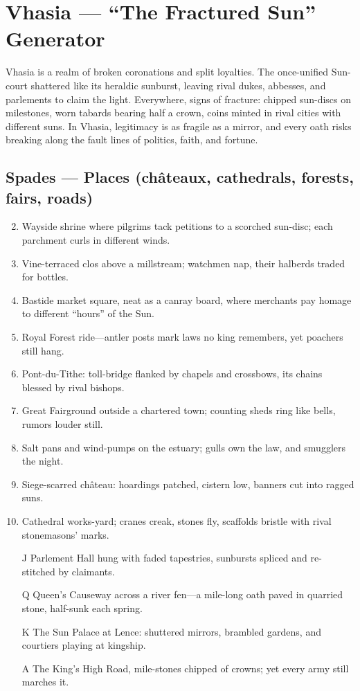 \section{Vhasia --- ``The Fractured Sun'' Generator}
\label{chap:vhasia}

Vhasia is a realm of broken coronations and split loyalties. The once-unified  Sun-court shattered like its heraldic sunburst, leaving rival dukes, abbesses, and parlements to claim the light. Everywhere, signs of fracture: chipped sun-discs on milestones, worn tabards bearing half a crown, coins minted in rival cities with different suns. In Vhasia,  legitimacy is as fragile as a mirror, and every oath risks breaking along the fault lines of politics, faith, and fortune.

\subsection*{Spades --- Places (châteaux, cathedrals, forests, fairs, roads)}
\label{sec:vhasia-places}
\begin{enumerate}
\setcounter{enumi}{1}
\item Wayside shrine where pilgrims tack petitions to a scorched sun-disc; each parchment curls in different winds.
\item Vine-terraced clos above a millstream; watchmen nap, their halberds traded for bottles.
\item Bastide market square, neat as a canray board, where merchants pay homage to different “hours” of the Sun.
\item Royal Forest ride---antler posts mark laws no king remembers, yet poachers still hang.
\item Pont-du-Tithe: toll-bridge flanked by chapels and crossbows, its chains blessed by rival bishops.
\item Great Fairground outside a chartered town; counting sheds ring like bells, rumors louder still.
\item Salt pans and wind-pumps on the estuary; gulls own the law, and smugglers the night.
\item Siege-scarred château: hoardings patched, cistern low, banners cut into ragged suns.
\item Cathedral works-yard; cranes creak, stones fly, scaffolds bristle with rival stonemasons’ marks.
\item[J] Parlement Hall hung with faded tapestries, sunbursts spliced and re-stitched by claimants.
\item[Q] Queen’s Causeway across a river fen---a mile-long oath paved in quarried stone, half-sunk each spring.
\item[K] The Sun Palace at Lence: shuttered mirrors, brambled gardens, and courtiers playing at kingship.
\item[A] The King’s High Road, mile-stones chipped of crowns; yet every army still marches it.
\end{enumerate}

